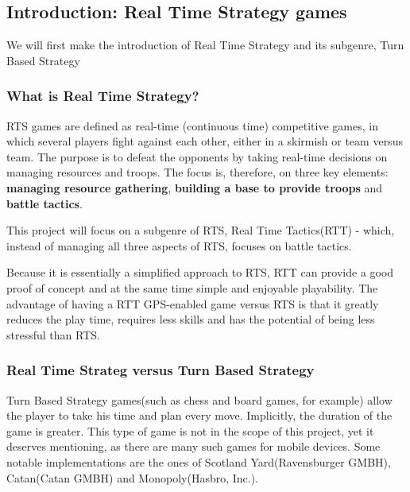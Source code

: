 \documentclass{article}
\begin{document}
\subsection{Introduction: Real Time Strategy games}

We will first make the introduction of Real Time Strategy and its subgenre, Turn
Based Strategy

\subsubsection{What is Real Time Strategy?}

RTS games are defined as real-time (continuous time) competitive games, in which
several players fight against each other, either in a skirmish or team versus
team. The purpose is to defeat the opponents by taking real-time decisions on
managing resources and troops. The focus is, therefore, on three key elements:
\textbf{managing resource gathering}, \textbf{building a base to provide troops}
and \textbf{battle tactics}.\cite{rts}\newline

This project will focus on a subgenre of RTS, Real Time Tactics(RTT) - which,
instead of managing all three aspects of RTS, focuses on battle tactics.\newline

Because it is essentially a simplified approach to RTS\cite{rttvsrts}, RTT can
provide a good proof of concept and at the same time simple and enjoyable
playability. The advantage of having a RTT GPS-enabled game versus RTS is that
it greatly reduces the play time, requires less skills and has the potential of
being less stressful than RTS.\newline

\subsubsection{Real Time Strateg versus Turn Based Strategy}

Turn Based Strategy games\cite{rtsvstbs}(such as chess and board games, for
example) allow the player to take his time and plan every move. Implicitly, the
duration of the game is greater. This type of game is not in the scope of this
project, yet it deserves mentioning, as there are many such games for mobile
devices. Some notable implementations are the ones of Scotland Yard(Ravensburger
GMBH), Catan(Catan GMBH) and Monopoly(Hasbro, Inc.).\newline
\end{document}
